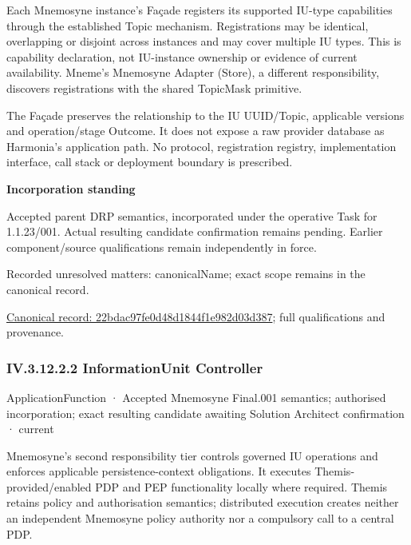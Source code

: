 Each Mnemosyne instance's Façade registers its supported IU-type capabilities through the established Topic mechanism. Registrations may be identical, overlapping or disjoint across instances and may cover multiple IU types. This is capability declaration, not IU-instance ownership or evidence of current availability. Mneme's Mnemosyne Adapter (Store), a different responsibility, discovers registrations with the shared TopicMask primitive.



The Façade preserves the relationship to the IU UUID/Topic, applicable versions and operation/stage Outcome. It does not expose a raw provider database as Harmonia's application path. No protocol, registration registry, implementation interface, call stack or deployment boundary is prescribed.



\par\medskip\textbf{Incorporation standing}\par


Accepted parent DRP semantics, incorporated under the operative Task for 1.1.23/001. Actual resulting candidate confirmation remains pending. Earlier component/source qualifications remain independently in force.


{\small Recorded unresolved matters: canonicalName; exact scope remains in the canonical record.}\par
{\footnotesize \href{../../../../continuum/application/application-function/22bdac97fe0d48d1844f1e982d03d387.md}{Canonical record: 22bdac97fe0d48d1844f1e982d03d387}; full qualifications and provenance.}\par
\subsubsection*{IV.3.12.2.2 InformationUnit Controller}
\label{navigation:IV.3.12.2.2}

\label{element:ef864d509efa44a7a4160db2ca821163}
{\small ApplicationFunction · Accepted Mnemosyne Final.001 semantics; authorised incorporation; exact resulting candidate awaiting Solution Architect confirmation · current}\par

Mnemosyne's second responsibility tier controls governed IU operations and enforces applicable persistence-context obligations. It executes Themis-provided/enabled PDP and PEP functionality locally where required. Themis retains policy and authorisation semantics; distributed execution creates neither an independent Mnemosyne policy authority nor a compulsory call to a central PDP.




